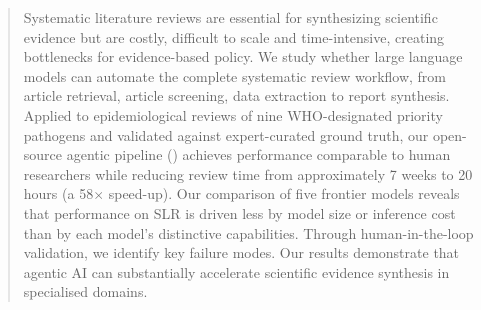 \begin{abstract}
Systematic literature reviews are essential for synthesizing scientific evidence but are costly, difficult to scale and time-intensive, creating bottlenecks for evidence-based policy. We study whether large language models can automate the complete systematic review workflow, from article retrieval, article screening, data extraction to report synthesis. Applied to epidemiological reviews of nine WHO-designated priority pathogens and validated against expert-curated ground truth, our open-source agentic pipeline (\name{}) achieves performance comparable to human researchers while reducing review time from approximately 7 weeks to 20 hours (a 58$\times$ speed-up). Our comparison of five frontier models reveals that performance on SLR is driven less by model size or inference cost than by each model's distinctive capabilities. Through human-in-the-loop validation, we identify key failure modes. Our results demonstrate that agentic AI can substantially accelerate scientific evidence synthesis in specialised domains. 
\end{abstract}